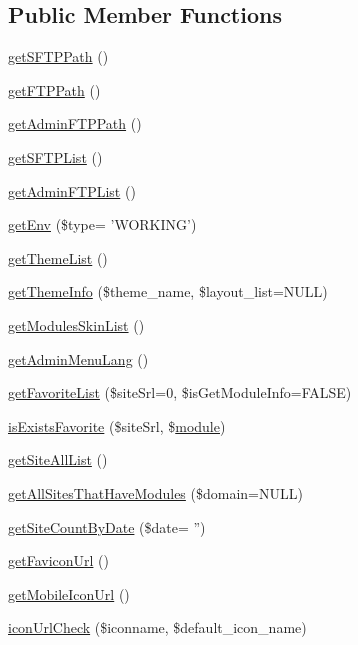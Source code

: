 \subsection*{Public Member Functions}
\begin{DoxyCompactItemize}
\item 
\hyperlink{classadminAdminModel_aaeac1a0a11439dfb4faa74751da8747e}{get\+S\+F\+T\+P\+Path} ()
\item 
\hyperlink{classadminAdminModel_a388c46fe906b6658eda70407ff9cdadb}{get\+F\+T\+P\+Path} ()
\item 
\hyperlink{classadminAdminModel_a155e29f18f17c6c657a457fcd65fd24b}{get\+Admin\+F\+T\+P\+Path} ()
\item 
\hyperlink{classadminAdminModel_adea58838b8595a28dc84d562bd1816ed}{get\+S\+F\+T\+P\+List} ()
\item 
\hyperlink{classadminAdminModel_a9e944aba1586e011811993745738728e}{get\+Admin\+F\+T\+P\+List} ()
\item 
\hyperlink{classadminAdminModel_afbd791a2932cb6f9f3d0550f4377829a}{get\+Env} (\$type= 'W\+O\+R\+K\+I\+N\+G')
\item 
\hyperlink{classadminAdminModel_a2a331c8f7fea9c12f56f5f5f75a3960c}{get\+Theme\+List} ()
\item 
\hyperlink{classadminAdminModel_afa7d3525c94669a9cdd141051213a765}{get\+Theme\+Info} (\$theme\+\_\+name, \$layout\+\_\+list=N\+U\+L\+L)
\item 
\hyperlink{classadminAdminModel_adde903c6e5edecd8b68b1afb232c92fe}{get\+Modules\+Skin\+List} ()
\item 
\hyperlink{classadminAdminModel_a6e21a5731925dc94cce1859dd96e7f25}{get\+Admin\+Menu\+Lang} ()
\item 
\hyperlink{classadminAdminModel_aa50a1de27a9e8431e5a17fffc053dc1e}{get\+Favorite\+List} (\$site\+Srl=0, \$is\+Get\+Module\+Info=F\+A\+L\+S\+E)
\item 
\hyperlink{classadminAdminModel_a6ba3dfaa5f5f1cc41284676b9e0b7b9d}{is\+Exists\+Favorite} (\$site\+Srl, \$\hyperlink{classmodule}{module})
\item 
\hyperlink{classadminAdminModel_a12f25a1c61e11bf727019171564b1cad}{get\+Site\+All\+List} ()
\item 
\hyperlink{classadminAdminModel_afca5a07a3f42ccc8c2f635557c668b44}{get\+All\+Sites\+That\+Have\+Modules} (\$domain=N\+U\+L\+L)
\item 
\hyperlink{classadminAdminModel_a7123fd762d0fbefec95c0fa6263ffd62}{get\+Site\+Count\+By\+Date} (\$date= '')
\item 
\hyperlink{classadminAdminModel_a66860278cfdc9b1130bc799bd8e81a84}{get\+Favicon\+Url} ()
\item 
\hyperlink{classadminAdminModel_ac54bf38cd7d6295f3a36294c6b3167e2}{get\+Mobile\+Icon\+Url} ()
\item 
\hyperlink{classadminAdminModel_a7c9daef493c063d6d4de836e8a511ec6}{icon\+Url\+Check} (\$iconname, \$default\+\_\+icon\+\_\+name)
\end{DoxyCompactItemize}
